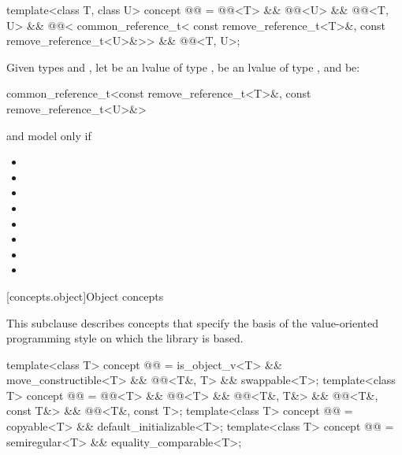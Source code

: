 \begin{itemdecl}
template<class T, class U>
  concept @@ =
    @@<T> && @@<U> &&
    @@<T, U> &&
    @@<
      common_reference_t<
        const remove_reference_t<T>&,
        const remove_reference_t<U>&>> &&
    @@<T, U>;
\end{itemdecl}

\begin{itemdescr}
\pnum
Given types  and ,
let  be an lvalue of type ,
 be an lvalue of type ,
and  be:
\begin{codeblock}
common_reference_t<const remove_reference_t<T>&, const remove_reference_t<U>&>
\end{codeblock}
 and  model
 only if

\begin{itemize}
\item {}
\item {}
\item {}
\item {}
\item {}
\item {}
\item {}
\item {}
\end{itemize}
\end{itemdescr}

[concepts.object]{Object concepts}

\pnum
This subclause describes concepts that specify the basis of the
value-oriented programming style on which the library is based.

\begin{itemdecl}
template<class T>
  concept @@ = is_object_v<T> && move_constructible<T> &&
                    @@<T&, T> && swappable<T>;
template<class T>
  concept @@ = @@<T> && @@<T> && @@<T&, T&> &&
                     @@<T&, const T&> && @@<T&, const T>;
template<class T>
  concept @@ = copyable<T> && default_initializable<T>;
template<class T>
  concept @@ = semiregular<T> && equality_comparable<T>;
\end{itemdecl}

